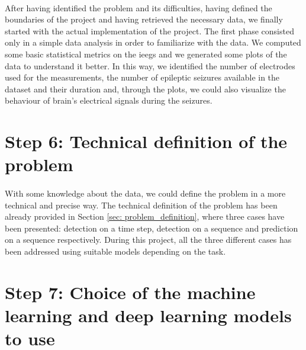 \paragraph{} After having identified the problem and its difficulties, having defined the boundaries of the project and having retrieved the necessary data, we finally started with the actual implementation of the project. The first phase consisted only in a simple data analysis in order to familiarize with the data. We computed some basic statistical metrics on the \acsp{ieeg} and we generated some plots of the data to understand it better. In this way, we identified the number of electrodes used for the measurements, the number of epileptic seizures available in the dataset and their duration and, through the plots, we could also visualize the behaviour of brain's electrical signals during the seizures.


\section{Step 6: Technical definition of the problem} \label{sec: step_technical_definition_problem}
\paragraph{} With some knowledge about the data, we could define the problem in a more technical and precise way. The technical definition of the problem has been already provided in Section \ref{sec: problem_definition}, where three cases have been presented: detection on a time step, detection on a sequence and prediction on a sequence respectively. During this project, all the three different cases has been addressed using suitable models depending on the task.


\section{Step 7: Choice of the machine learning and deep learning models to use} \label{sec: step_choice_models_to_use}
